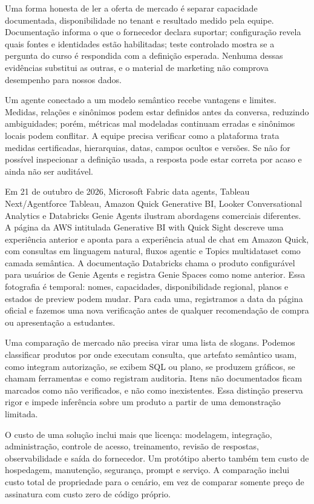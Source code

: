 Uma forma honesta de ler a oferta de mercado é separar capacidade documentada, disponibilidade no tenant e resultado medido pela equipe. Documentação informa o que o fornecedor declara suportar; configuração revela quais fontes e identidades estão habilitadas; teste controlado mostra se a pergunta do curso é respondida com a definição esperada. Nenhuma dessas evidências substitui as outras, e o material de marketing não comprova desempenho para nossos dados.

Um agente conectado a um modelo semântico recebe vantagens e limites. Medidas, relações e sinônimos podem estar definidos antes da conversa, reduzindo ambiguidades; porém, métricas mal modeladas continuam erradas e sinônimos locais podem conflitar. A equipe precisa verificar como a plataforma trata medidas certificadas, hierarquias, datas, campos ocultos e versões. Se não for possível inspecionar a definição usada, a resposta pode estar correta por acaso e ainda não ser auditável.

Em 21 de outubro de 2026, Microsoft Fabric data agents, Tableau Next/Agentforce Tableau, Amazon Quick Generative BI, Looker Conversational Analytics e Databricks Genie Agents ilustram abordagens comerciais diferentes. A página da AWS intitulada Generative BI with Quick Sight descreve uma experiência anterior e aponta para a experiência atual de chat em Amazon Quick, com consultas em linguagem natural, fluxos agentic e Topics multidataset como camada semântica. A documentação Databricks chama o produto configurável para usuários de Genie Agents e registra Genie Spaces como nome anterior. Essa fotografia é temporal: nomes, capacidades, disponibilidade regional, planos e estados de preview podem mudar. Para cada uma, registramos a data da página oficial e fazemos uma nova verificação antes de qualquer recomendação de compra ou apresentação a estudantes.

Uma comparação de mercado não precisa virar uma lista de slogans. Podemos classificar produtos por onde executam consulta, que artefato semântico usam, como integram autorização, se exibem SQL ou plano, se produzem gráficos, se chamam ferramentas e como registram auditoria. Itens não documentados ficam marcados como não verificados, e não como inexistentes. Essa distinção preserva rigor e impede inferência sobre um produto a partir de uma demonstração limitada.

O custo de uma solução inclui mais que licença: modelagem, integração, administração, controle de acesso, treinamento, revisão de respostas, observabilidade e saída do fornecedor. Um protótipo aberto também tem custo de hospedagem, manutenção, segurança, prompt e serviço. A comparação inclui custo total de propriedade para o cenário, em vez de comparar somente preço de assinatura com custo zero de código próprio.

